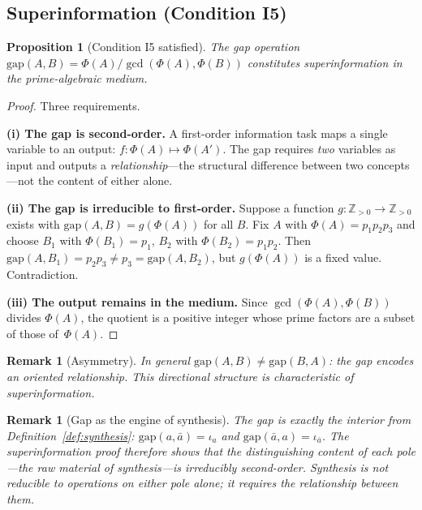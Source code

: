 \documentclass[11pt,a4paper]{article}
\newtheorem{proposition}[theorem]{Proposition}
\newtheorem{remark}[theorem]{Remark}
\begin{document}
\subsection{Superinformation (Condition I5)}

\begin{proposition}[Condition I5 satisfied]
\label{prop:super}
The gap operation
$\mathrm{gap}(A,B)=\Phi(A)/\gcd(\Phi(A),\Phi(B))$
constitutes superinformation in the prime-algebraic medium.
\end{proposition}

\begin{proof}
Three requirements.

\textbf{(i) The gap is second-order.} A first-order information
task maps a single variable to an output:
$f:\Phi(A)\mapsto\Phi(A')$. The gap requires \emph{two} variables
as input and outputs a \emph{relationship}---the structural
difference between two concepts---not the content of either alone.

\textbf{(ii) The gap is irreducible to first-order.} Suppose a
function $g:\mathbb{Z}_{>0}\to\mathbb{Z}_{>0}$ exists with
$\mathrm{gap}(A,B)=g(\Phi(A))$ for all $B$. Fix $A$ with
$\Phi(A)=p_1 p_2 p_3$ and choose $B_1$ with $\Phi(B_1)=p_1$,
$B_2$ with $\Phi(B_2)=p_1 p_2$. Then
$\mathrm{gap}(A,B_1)=p_2 p_3 \neq p_3=\mathrm{gap}(A,B_2)$,
but $g(\Phi(A))$ is a fixed value. Contradiction.

\textbf{(iii) The output remains in the medium.} Since
$\gcd(\Phi(A),\Phi(B))$ divides $\Phi(A)$, the quotient is a
positive integer whose prime factors are a subset of those
of~$\Phi(A)$.
\end{proof}

\begin{remark}[Asymmetry]
In general $\mathrm{gap}(A,B)\neq\mathrm{gap}(B,A)$: the gap
encodes an \emph{oriented} relationship. This directional structure
is characteristic of superinformation.
\end{remark}

\begin{remark}[Gap as the engine of synthesis]
The gap is exactly the interior from
Definition~\ref{def:synthesis}: $\mathrm{gap}(a,\bar{a})=\iota_a$
and $\mathrm{gap}(\bar{a},a)=\iota_{\bar{a}}$. The
superinformation proof therefore shows that the
\emph{distinguishing content} of each pole---the raw material of
synthesis---is irreducibly second-order. Synthesis is not reducible
to operations on either pole alone; it requires the relationship
between them.
\end{remark}
\end{document}
